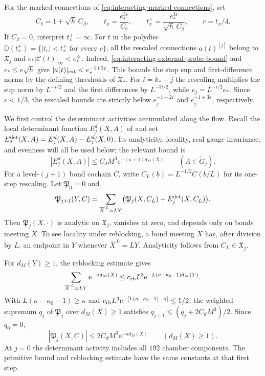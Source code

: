 \documentclass[11pt,letterpaper,reqno]{amsart}
\begin{document}
For the marked connections of
\eqref{eq:interacting-marked-connections}, set
\begin{equation}\label{eq:interacting-mark-radii}
 C_b=1+\sqrt h\,C_\beta,\qquad
 t_x=\frac{e_*^{3\varepsilon}}{C_b},\qquad
 t_x^+=\frac{e_*^{3\varepsilon}}{\sqrt h\,C_\beta},
 \qquad r=t_x/4.
\end{equation}
If $C_\beta=0$, interpret $t_x^+=\infty$.
For $t$ in the polydisc
$\mathbb D(t_x^+)=\{|t_c|<t_x^+\text{ for every }c\}$,
all the rescaled connections $a(t)^{[j]}$
belong to $\mathfrak X_j$ and
$e_*|\mathscr C(t)|_\infty<e_*^{3\varepsilon}$.
Indeed, \eqref{eq:interacting-external-probe-bound}
and $e_*\le e\sqrt h$ give
$|a(t)|_{\rm ext}<e_*^{-1+3\varepsilon}$.
This bounds the stop sup and first-difference
norms by the defining thresholds of $\mathfrak X_*$.
For $i=k_*-j$ the rescaling multiplies
the sup norm by $L^{-i/2}$ and the first
differences by $L^{-3i/2}$, while
$e_j=L^{-i/2}e_*$. Since
$\varepsilon<1/3$, the rescaled bounds are
strictly below $e_j^{-1+2\varepsilon}$ and
$e_j^{-1+3\varepsilon}$, respectively.

We first control the determinant activities accumulated
along the flow. Recall the local determinant
function $E_j^d(X,A)$ of
\cite[Proposition~6.1]{FermionBlock} and set
$E_j^{\rm det}(X,A)=E_j^d(X,A)-E_j^d(X,0)$.
Its analyticity, locality, real gauge invariance,
and evenness will all be used below; the relevant
bound is
\begin{equation}\label{eq:interacting-determinant-input}
 |E_j^d(X,A)|\le C_dM^3\mathrm e^{-(\kappa+1)d_M(X)}
                       \qquad(A\in\widetilde G_j).
\end{equation}
For a level-$(j+1)$ bond cochain $C$, write
$C_L(b)=L^{-1/2}C(b/L)$ for its one-step rescaling.
Let $\mathfrak P_0=0$ and
\begin{equation}\label{eq:interacting-P-recursion}
 \mathfrak P_{j+1}(Y,C)=
 \sum_{\overline X^{\,L}=LY}
       \bigl(\mathfrak P_j(X,C_L)+E_j^{\rm det}(X,C_L)\bigr).
\end{equation}
Then $\mathfrak P_j(X,\cdot)$ is analytic on
$\mathfrak X_j$, vanishes at zero, and depends only
on bonds meeting $X$. To see locality under
reblocking, a bond meeting $X$ has, after division
by $L$, an endpoint in $Y$ whenever
$\overline X^{\,L}=LY$. Analyticity follows from
$C_L\in\mathfrak X_j$.

For $d_M(Y)\ge1$, the reblocking estimate gives
\[
 \sum_{\overline X^{\,L}=LY}\mathrm e^{-\kappa d_M(X)}
 \le c_{\rm rb}L^3\mathrm e^{-L(\kappa-\kappa_0-1)d_M(Y)}.
\]
With
$L(\kappa-\kappa_0-1)\ge\kappa$ and
$c_{\rm rb}L^3\mathrm e^{-[L(\kappa-\kappa_0-1)-\kappa]}\le1/2$,
the weighted supremum $q_j$ of $\mathfrak P_j$
over $d_M(X)\ge1$ satisfies
$q_{j+1}\le(q_j+2C_dM^3)/2$. Since $q_0=0$,
\begin{equation}\label{eq:interacting-P-bound}
 |\mathfrak P_j(X,C)|\le2C_dM^3\mathrm e^{-\kappa d_M(X)}
                           \qquad(d_M(X)\ge1).
\end{equation}
At $j=0$ the determinant activity includes all
$192$ chamber components. The primitive bound and
reblocking estimate have the same constants at
that first step.
\end{document}

